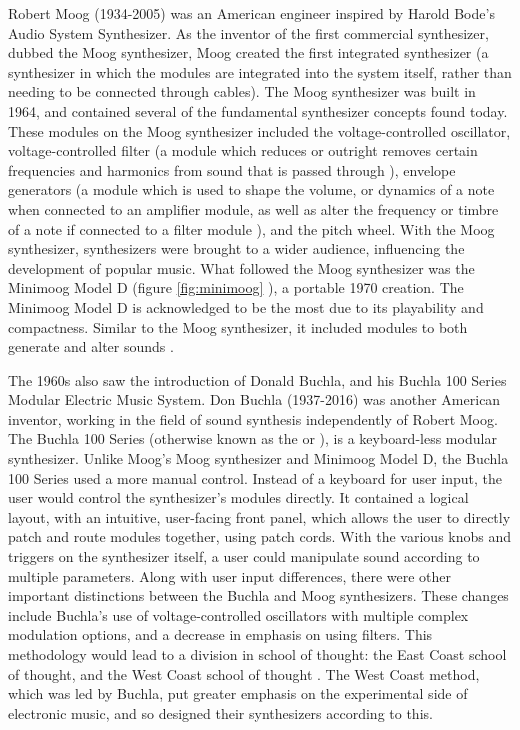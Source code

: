 Robert Moog (1934-2005) was an American engineer inspired by Harold Bode's Audio System Synthesizer. As the inventor of the first commercial synthesizer, dubbed the Moog synthesizer, Moog created the first integrated synthesizer (a synthesizer in which the modules are integrated into the system itself, rather than needing to be connected through cables). The Moog synthesizer was built in 1964, and contained several of the fundamental synthesizer concepts found today\cite{Pinch_Trocco_2004}. These modules on the Moog synthesizer included the voltage-controlled oscillator, voltage-controlled filter (a module which reduces or outright removes certain frequencies and harmonics from sound that is passed through \cite{Meyer_2016}), envelope generators (a module which is used to shape the volume, or dynamics of a note when connected to an amplifier module, as well as alter the frequency or timbre of a note if connected to a filter module \cite{Meyer_2016}), and the pitch wheel. With the Moog synthesizer, synthesizers were brought to a wider audience, influencing the development of popular music\cite{Pinch_Trocco_2004}. What followed the Moog synthesizer was the Minimoog Model D (figure \ref{fig:minimoog} \cite{Krash_2005}), a portable 1970 creation. The Minimoog Model D is acknowledged to be the most \cite{Gabrielli_2020} due to its playability and compactness. Similar to the Moog synthesizer, it included modules to both generate and alter sounds \cite{Pinch_Trocco_2002}.

The 1960s also saw the introduction of Donald  Buchla, and his Buchla 100 Series Modular Electric Music System. Don Buchla (1937-2016) was another American inventor, working in the field of sound synthesis independently of Robert Moog. The Buchla 100 Series (otherwise known as the  or ), is a keyboard-less modular synthesizer. Unlike Moog's Moog synthesizer and Minimoog Model D, the Buchla 100 Series used a more manual control\cite{Pinch_Trocco_1998}. Instead of a keyboard for user input, the user would control the synthesizer's modules directly. It contained a logical layout, with an intuitive, user-facing front panel, which allows the user to directly patch and route modules together, using patch cords. With the various knobs and triggers on the synthesizer itself, a user could manipulate sound according to multiple parameters. Along with user input differences, there were other important distinctions between the Buchla and Moog synthesizers. These changes include Buchla's use of voltage-controlled oscillators with multiple complex modulation options, and a decrease in emphasis on using filters. This methodology would lead to a division in school of thought: the East Coast school of thought, and the West Coast school of thought \cite{Gabrielli_2020}. The West Coast method, which was led by Buchla, put greater emphasis on the experimental side of electronic music, and so designed their synthesizers according to this.

